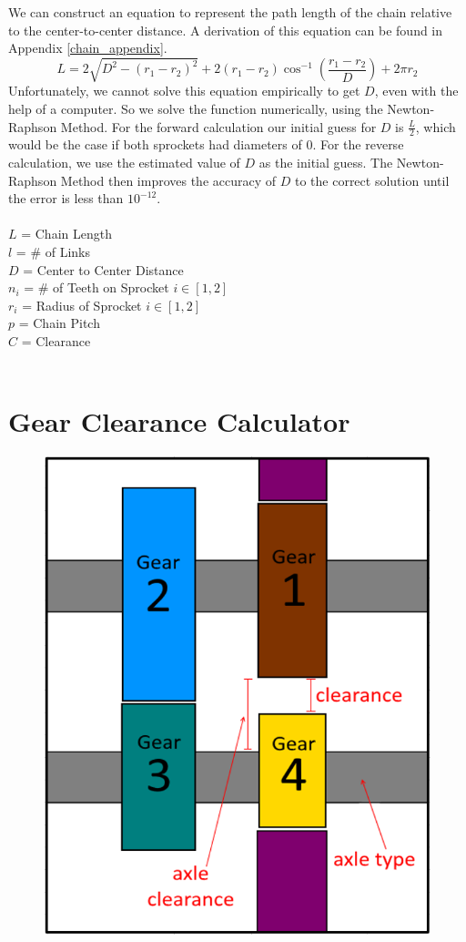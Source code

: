 \documentclass[11pt,a4paper,titlepage]{article}
\begin{document}
	We can construct an equation to represent the path length of the chain relative to the center-to-center distance. A derivation of this equation can be found in Appendix \ref{chain_appendix}.
	\begin{equation} \label{chain_len}
		L = 2 \sqrt{D^2 - (r_1 - r_2)^2} + 2 (r_1 - r_2) \cos^{-1} \left( \frac{r_1 - r_2}{D} \right) + 2 \pi r_2
	\end{equation}
	Unfortunately, we cannot solve this equation empirically to get $D$, even with the help of a computer. So we solve the function numerically, using the Newton-Raphson Method. For the forward calculation our initial guess for $D$ is $\frac{L}{2}$, which would be the case if both sprockets had diameters of 0. For the reverse calculation, we use the estimated value of $D$ as the initial guess. The Newton-Raphson Method then improves the accuracy of $D$ to the correct solution until the error is less than $10^{-12}$.\\ \\
	$L$ = Chain Length \\
	$l$ = \# of Links \\
	$D$ = Center to Center Distance \\
	$n_i$ = \# of Teeth on Sprocket $i \in [1,2]$ \\
	$r_i$ = Radius of Sprocket $i \in [1,2]$ \\
	$p$ = Chain Pitch \\
	$C$ = Clearance \\ \\
	
	\bigskip
	\section{Gear Clearance Calculator}
	\begin{figure}[H]
		\centering
		\includegraphics[width=0.4\linewidth]{Gear_Clear}
	\end{figure}
	
\end{document}
